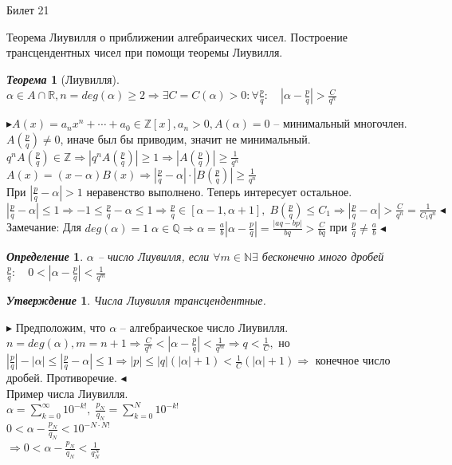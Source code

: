 \documentclass[a4paper,12pt]{article}
\newtheorem{deff}{\textit{Определение}}
\newtheorem{teo}{\textit{Теорема}}
\newtheorem{utv}{\textit{Утверждение}}
\newcommand{\AL}{\alpha}
\newcommand{\q}{\quad}
\newcommand{\pb}{\blacktriangleright}
\newcommand{\pe}{\blacktriangleleft}
\newcommand{\Ra}{\Rightarrow}
\newcommand{\bb}[1]{\mathbb{#1}}
\newcommand{\SL}{\sum\limits}
\begin{document}
\newpage
\begin{mybox}{\hypertarget{bil21}{Билет 21}}

\begin{formbox}{}
Теорема Лиувилля о приближении алгебраических чисел. Построение трансцендентных чисел при помощи теоремы Лиувилля.
\end{formbox}

\begin{formbox}{}
\begin{teo} [Лиувилля] $\AL \in A\cap \bb{R}, n = deg(\AL) \ge 2\Ra \exists C = C(\AL) > 0: \forall \frac{p}{q}:\q \left|\AL - \frac{p}{q} \right| > \frac{C}{q^n} $
\end{teo}
\end{formbox}
$\pb A(x) = a_nx^n +\cdots + a_0 \in \bb{Z}[x], a_n > 0, A(\AL) = 0 $ -- минимальный многочлен.\\
$A(\frac{p}{q})\not=0$, иначе был бы приводим, значит не минимальный.\\
$q^n A(\frac{p}{q}) \in\bb{Z}\Ra |q^n A(\frac{p}{q})| \ge 1 \Ra |A(\frac{p}{q})| \ge \frac{1}{q^n}$\\
$A(x) = (x-\AL)B(x)\Ra \left| \frac{p}{q} - \AL\right| \cdot |B(\frac{p}{q})| \ge \frac{1}{q^n}$\\
При $\left| \frac{p}{q} - \AL\right| > 1$ неравенство выполнено. Теперь интересует остальное.\\
$\left| \frac{p}{q} - \AL\right| \le 1\Ra -1 \le \frac{p}{q} - \AL \le 1\Ra \frac{p}{q}\in[\AL-1, \AL+1], \; B(\frac{p}{q}) \le C_1\Ra \left| \frac{p}{q} - \AL\right| > \frac{C}{q^n} = \frac{1}{C_1 q^n} \pe$\\
Замечание: Для $deg(\AL) = 1\; \AL\in\bb{Q}\Ra \AL = \frac{a}{b} \left| \AL - \frac{p}{q} \right| = \frac{|aq - bp|}{bq} > \frac{C}{bq} $ при $\frac{p}{q} \not=\frac{a}{b}\pe$
\begin{formbox}{}
\begin{deff} $\AL$ -- число Лиувилля, если $\forall m\in\bb{N} \exists$ бесконечно много дробей $\frac{p}{q}: \q 0 < |\AL - \frac{p}{q}| < \frac{1}{q^m}$
\end{deff}
\end{formbox}

\begin{formbox}{}
\begin{utv} Числа Лиувилля трансцендентные.
\end{utv}
\end{formbox}
$\pb$ Предположим, что $\AL$ -- алгебраическое число Лиувилля. $n = deg(\AL), m = n+1\Ra \frac{C}{q^n}< |\AL - \frac{p}{q}| < \frac{1}{q^m}\Ra q<\frac{1}{C},$ но $|\frac{p}{q}| - |\AL| \le |\frac{p}{q} - \AL| \le 1\Ra |p| \le |q|(|\AL| + 1) < \frac{1}{C} (|\AL| + 1)\Ra$ конечное число дробей. Противоречие. $\pe$\\
Пример числа Лиувилля.\\
$\AL = \SL_{k=0}^\infty 10^{-k!},\;\frac{p_N}{q_N} = \SL_{k=0}^N 10^{-k!}$\\
$0 < \AL - \frac{p_N}{q_N} < 10^{-N\cdot N!}$\\
$\Ra 0 < \AL - \frac{p_N}{q_N} < \frac{1}{q_N^N} $


\end{mybox}
\end{document}
